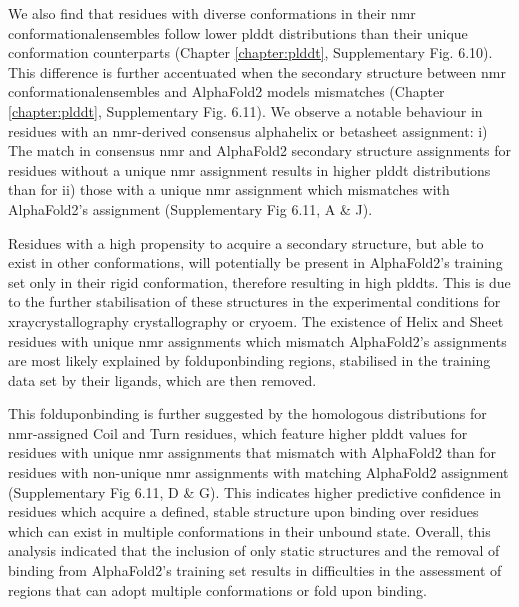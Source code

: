We also find that residues with diverse \glspl{conformation} in their \gls{nmr} \glspl{conformationalensemble} follow lower \gls{plddt} distributions than their unique \gls{conformation} counterparts (Chapter \ref{chapter:plddt}, Supplementary Fig. 6.10). This difference is further accentuated when the secondary structure between \gls{nmr} \glspl{conformationalensemble} and AlphaFold2 models mismatches (Chapter \ref{chapter:plddt}, Supplementary Fig. 6.11). We observe a notable behaviour in residues with an \gls{nmr}-derived consensus \gls{alphahelix} or \gls{betasheet} assignment: i) The match in consensus \gls{nmr} and AlphaFold2 secondary structure assignments for residues without a unique \gls{nmr} assignment results in higher \gls{plddt} distributions than for ii) those with a unique \gls{nmr} assignment which mismatches with AlphaFold2's assignment (Supplementary Fig 6.11, A \& J). 

Residues with a high propensity to acquire a secondary structure, but able to exist in other \glspl{conformation}, will potentially be present in AlphaFold2's training set only in their rigid \gls{conformation}, therefore resulting in high \glspl{plddt}. This is due to the further stabilisation of these structures in the experimental conditions for \gls{xraycrystallography} crystallography or \gls{cryoem}. The existence of Helix and Sheet residues with unique \gls{nmr} assignments which mismatch AlphaFold2's assignments are most likely explained by \gls{folduponbinding} regions, stabilised in the training data set by their ligands, which are then removed. 

This \gls{folduponbinding} is further suggested by the homologous distributions for \gls{nmr}-assigned Coil and Turn residues, which feature higher \gls{plddt} values for residues with unique \gls{nmr} assignments that mismatch with AlphaFold2 than for residues with non-unique \gls{nmr} assignments with matching AlphaFold2 assignment (Supplementary Fig 6.11, D \& G). This indicates higher predictive confidence in residues which acquire a defined, stable structure upon binding over residues which can exist in multiple \glspl{conformation} in their unbound state. Overall, this analysis indicated that the inclusion of only static structures and the removal of binding from AlphaFold2's training set results in difficulties in the assessment of regions that can adopt multiple \glspl{conformation} or fold upon binding. 

